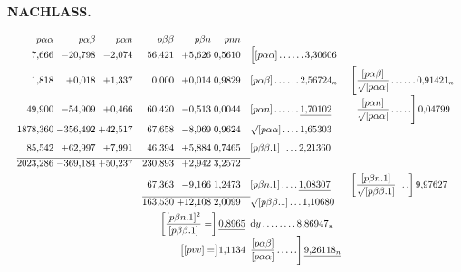 \par\clearpage
\noindent{}\hfill{\small\textbf{NACHLASS.}}\hfill\null\par\medskip

\[
\resizebox{\linewidth}{!}{\(\begin{array}{@{}r@{\;}r@{\;}r@{\quad}r@{\;}r@{\;}r@{\quad}l@{\quad}l@{}}
 p\alpha\alpha&p\alpha\beta&p\alpha n&p\beta\beta&p\beta n&pnn&&\\[1pt]
 7{,}666&-20{,}798&-2{,}074&56{,}421&+5{,}626&0{,}5610&
 \Bigl[[p\alpha\alpha]\,.\,.\,.\,.\,.\,.\,3{,}30606&\\[5pt]
 1{,}818&+0{,}018&+1{,}337&0{,}000&+0{,}014&0{,}9829&
 [p\alpha\beta]\,.\,.\,.\,.\,.\,.\,2{,}56724_{n}&
 \Biggl[\dfrac{[p\alpha\beta]}{\surd[p\alpha\alpha]}\,.\,.\,.\,.\,.\,.\,0{,}91421_{n}\\[5pt]
 49{,}900&-54{,}909&+0{,}466&60{,}420&-0{,}513&0{,}0044&
 [p\alpha n]\,.\,.\,.\,.\,.\,.\,\underline{1{,}70102}&
 \phantom{\Biggl[}\dfrac{[p\alpha n]}{\surd[p\alpha\alpha]}\,.\,.\,.\,.\,.\Biggr]\,0{,}04799\\[5pt]
 1878{,}360&-356{,}492&+42{,}517&67{,}658&-8{,}069&0{,}9624&
 \surd[p\alpha\alpha]\,.\,.\,.\,.\,1{,}65303&\\[7pt]
 85{,}542&+62{,}997&+7{,}991&46{,}394&+5{,}884&0{,}7465&
 [p\beta\beta.1]\,.\,.\,.\,.\,2{,}21360&\\[4pt]
 \cline{1-6}
 2023{,}286&-369{,}184&+50{,}237&230{,}893&+2{,}942&3{,}2572&&\\[4pt]
 &&&67{,}363&-9{,}166&1{,}2473&
 [p\beta n.1]\,.\,.\,.\,.\,\underline{1{,}08307}&
 \left[\dfrac{[p\beta n.1]}{\surd[p\beta\beta.1]}\,.\,.\,.\right]9{,}97627\\[5pt]
 \cline{4-6}
 &&&163{,}530&+12{,}108&2{,}0099&
 \surd[p\beta\beta.1]\,.\,.\,.\,1{,}10680&\\[4pt]
 \multicolumn{6}{r}{\left[\dfrac{[p\beta n.1]^2}{[p\beta\beta.1]}=\right]\underline{0{,}8965}}&
 \mathrm{d}y\,.\,.\,.\,.\,.\,.\,.\,.\,8{,}86947_{n}&\\[5pt]
 \multicolumn{6}{r}{\bigl[[pvv]=\bigr]1{,}1134}&
 \dfrac{[p\alpha\beta]}{[p\alpha\alpha]}\,.\,.\,.\,.\,.\Biggr]\,\underline{9{,}26118_{n}}&
\end{array}\)}
\]

